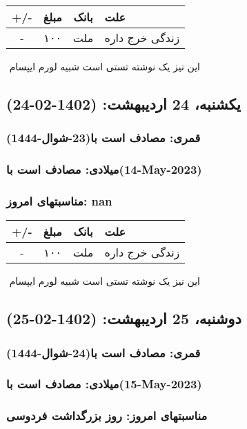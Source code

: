 \documentclass{article}
\newcommand{\rnote}[1]{\marginpar{\textcolor{color}{\StrSubstitute{\##1}{ }{\_}}}}
\newcommand{\myRow}[4]{
    #1 & #2 & #3 & #4 \\ \hline
}
\begin{document}
\begin{tabular}{ | c | c | c | p{5cm} |}
    \hline
    \myRow{ +/- }{مبلغ}{بانک}{علت}
    \myRow{-}{۱۰۰}{ملت}{زندگی خرج داره}
\end{tabular}
\newline
\newline

‌
\rnote{تست}
این نیز یک نوشته تستی است شبیه لورم ایپسام




\newpage
{}
\textcolor{color}{
\section{ یکشنبه، 24 اردیبهشت: (1402-02-24) }
\subsubsection*{قمری: مصادف است با(23-شوال-1444)} 
\subsubsection*{میلادی: مصادف است با(14-May-2023)}
\subsubsection*{مناسبتهای امروز: nan}
}


\begin{tabular}{ | c | c | c | p{5cm} |}
    \hline
    \myRow{ +/- }{مبلغ}{بانک}{علت}
    \myRow{-}{۱۰۰}{ملت}{زندگی خرج داره}
\end{tabular}
\newline
\newline

‌
\rnote{تست}
این نیز یک نوشته تستی است شبیه لورم ایپسام




\newpage
{}
\textcolor{color}{
\section{ دوشنبه، 25 اردیبهشت: (1402-02-25) }
\subsubsection*{قمری: مصادف است با(24-شوال-1444)} 
\subsubsection*{میلادی: مصادف است با(15-May-2023)}
\subsubsection*{مناسبتهای امروز: روز بزرگداشت فردوسی}
}
\end{document}
